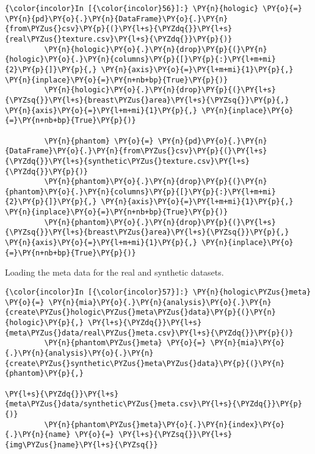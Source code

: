     \begin{Verbatim}[commandchars=\\\{\}]
{\color{incolor}In [{\color{incolor}56}]:} \PY{n}{hologic} \PY{o}{=} \PY{n}{pd}\PY{o}{.}\PY{n}{DataFrame}\PY{o}{.}\PY{n}{from\PYZus{}csv}\PY{p}{(}\PY{l+s}{\PYZdq{}}\PY{l+s}{real\PYZus{}texture.csv}\PY{l+s}{\PYZdq{}}\PY{p}{)}
         \PY{n}{hologic}\PY{o}{.}\PY{n}{drop}\PY{p}{(}\PY{n}{hologic}\PY{o}{.}\PY{n}{columns}\PY{p}{[}\PY{p}{:}\PY{l+m+mi}{2}\PY{p}{]}\PY{p}{,} \PY{n}{axis}\PY{o}{=}\PY{l+m+mi}{1}\PY{p}{,} \PY{n}{inplace}\PY{o}{=}\PY{n+nb+bp}{True}\PY{p}{)}
         \PY{n}{hologic}\PY{o}{.}\PY{n}{drop}\PY{p}{(}\PY{l+s}{\PYZsq{}}\PY{l+s}{breast\PYZus{}area}\PY{l+s}{\PYZsq{}}\PY{p}{,} \PY{n}{axis}\PY{o}{=}\PY{l+m+mi}{1}\PY{p}{,} \PY{n}{inplace}\PY{o}{=}\PY{n+nb+bp}{True}\PY{p}{)}

         \PY{n}{phantom} \PY{o}{=} \PY{n}{pd}\PY{o}{.}\PY{n}{DataFrame}\PY{o}{.}\PY{n}{from\PYZus{}csv}\PY{p}{(}\PY{l+s}{\PYZdq{}}\PY{l+s}{synthetic\PYZus{}texture.csv}\PY{l+s}{\PYZdq{}}\PY{p}{)}
         \PY{n}{phantom}\PY{o}{.}\PY{n}{drop}\PY{p}{(}\PY{n}{phantom}\PY{o}{.}\PY{n}{columns}\PY{p}{[}\PY{p}{:}\PY{l+m+mi}{2}\PY{p}{]}\PY{p}{,} \PY{n}{axis}\PY{o}{=}\PY{l+m+mi}{1}\PY{p}{,} \PY{n}{inplace}\PY{o}{=}\PY{n+nb+bp}{True}\PY{p}{)}
         \PY{n}{phantom}\PY{o}{.}\PY{n}{drop}\PY{p}{(}\PY{l+s}{\PYZsq{}}\PY{l+s}{breast\PYZus{}area}\PY{l+s}{\PYZsq{}}\PY{p}{,} \PY{n}{axis}\PY{o}{=}\PY{l+m+mi}{1}\PY{p}{,} \PY{n}{inplace}\PY{o}{=}\PY{n+nb+bp}{True}\PY{p}{)}
\end{Verbatim}

    Loading the meta data for the real and synthetic datasets.

    \begin{Verbatim}[commandchars=\\\{\}]
{\color{incolor}In [{\color{incolor}57}]:} \PY{n}{hologic\PYZus{}meta} \PY{o}{=} \PY{n}{mia}\PY{o}{.}\PY{n}{analysis}\PY{o}{.}\PY{n}{create\PYZus{}hologic\PYZus{}meta\PYZus{}data}\PY{p}{(}\PY{n}{hologic}\PY{p}{,} \PY{l+s}{\PYZdq{}}\PY{l+s}{meta\PYZus{}data/real\PYZus{}meta.csv}\PY{l+s}{\PYZdq{}}\PY{p}{)}
         \PY{n}{phantom\PYZus{}meta} \PY{o}{=} \PY{n}{mia}\PY{o}{.}\PY{n}{analysis}\PY{o}{.}\PY{n}{create\PYZus{}synthetic\PYZus{}meta\PYZus{}data}\PY{p}{(}\PY{n}{phantom}\PY{p}{,}
                                                                \PY{l+s}{\PYZdq{}}\PY{l+s}{meta\PYZus{}data/synthetic\PYZus{}meta.csv}\PY{l+s}{\PYZdq{}}\PY{p}{)}
         \PY{n}{phantom\PYZus{}meta}\PY{o}{.}\PY{n}{index}\PY{o}{.}\PY{n}{name} \PY{o}{=} \PY{l+s}{\PYZsq{}}\PY{l+s}{img\PYZus{}name}\PY{l+s}{\PYZsq{}}
\end{Verbatim}

